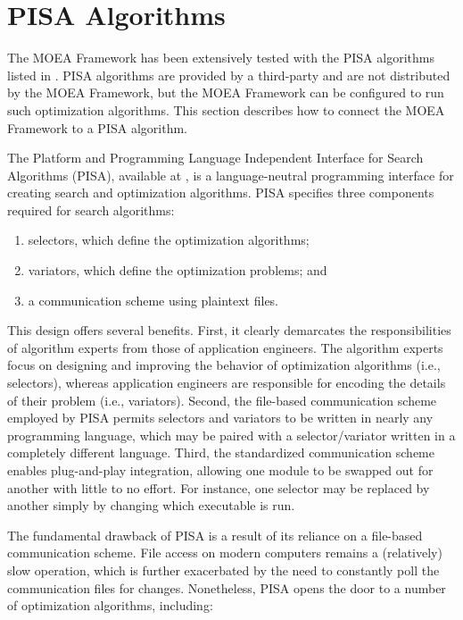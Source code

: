 \section{PISA Algorithms}
The MOEA Framework has been extensively tested with the PISA algorithms listed in .  PISA algorithms are provided by a third-party and are not distributed by the MOEA Framework, but the MOEA Framework can be configured to run such optimization algorithms.  This section describes how to connect the MOEA Framework to a PISA algorithm.

The Platform and Programming Language Independent Interface for Search Algorithms (PISA), available at , is a language-neutral programming interface for creating search and optimization algorithms.  PISA specifies three components required for search algorithms:

\begin{enumerate}
  \item selectors, which define the optimization algorithms;
  \item variators, which define the optimization problems; and
  \item a communication scheme using plaintext files.
\end{enumerate}

This design offers several benefits.  First, it clearly demarcates the responsibilities of algorithm experts from those of application engineers.  The algorithm experts focus on designing and improving the behavior of optimization algorithms (i.e., selectors), whereas application engineers are responsible for encoding the details of their problem (i.e., variators).  Second, the file-based communication scheme employed by PISA permits selectors and variators to be written in nearly any programming language, which may be paired with a selector/variator written in a completely different language.  Third, the standardized communication scheme enables plug-and-play integration, allowing one module to be swapped out for another with little to no effort.  For instance, one selector may be replaced by another simply by changing which executable is run.

The fundamental drawback of PISA is a result of its reliance on a file-based communication scheme.  File access on modern computers remains a (relatively) slow operation, which is further exacerbated by the need to constantly poll the communication files for changes.  Nonetheless, PISA opens the door to a number of optimization algorithms, including:

